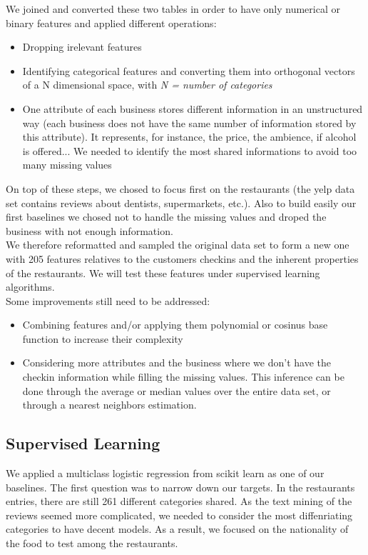 \documentclass[paper=a4, fontsize=11pt]{scrartcl} %
\numberwithin{equation}{section}
\numberwithin{figure}{section}
\numberwithin{table}{section}
\begin{document}
We joined and converted these two tables in order to have only numerical or binary features and applied different operations:
\begin{itemize}
	\item Dropping irelevant features
	\item Identifying categorical features and converting them into orthogonal vectors of a N dimensional space, with  \textit{N = number of categories}
	\item One attribute of each business stores different information in an unstructured way (each business does not have the same number of information stored by this attribute). It  represents, for instance, the price, the ambience, if alcohol is offered... We needed to identify the most shared informations to avoid too many missing values
\end{itemize}
On top of these steps, we chosed to focus first on the restaurants (the yelp data set contains reviews about dentists, supermarkets, etc.). Also to build easily our first baselines we chosed not to handle the missing values and droped the business with not enough information.\\

We therefore reformatted and sampled the original data set to form a new one with 205 features relatives to the customers checkins and the inherent properties of the restaurants. We will test these features under supervised learning algorithms.\\

Some improvements still need to be addressed:
\begin{itemize}
	\item Combining features and/or applying them polynomial or cosinus base function to increase their complexity
	\item Considering more attributes and the business where we don't have the checkin information while filling the missing values. This inference can be done through the average or median values over the entire data set, or through a nearest neighbors estimation.
\end{itemize}

\subsection{Supervised Learning} 

We applied a multiclass logistic regression from scikit learn as one of our baselines. The first question was to narrow down our targets. In the restaurants entries, there are still 261 different categories shared. As the text mining of the reviews seemed more complicated, we needed to consider the most diffenriating categories to have decent models. As a result, we focused on the nationality of the food to test among the restaurants.\\
\end{document}
